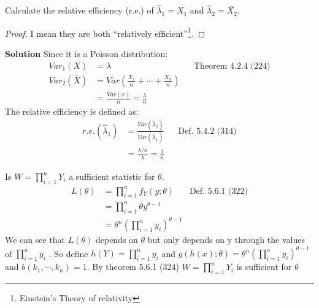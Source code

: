\documentclass[12pt]{article}
\newenvironment{problem}[2][Problem]{\begin{trivlist}
\item[\hskip \labelsep {\bfseries #1}\hskip \labelsep {\bfseries #2.}]}{\end{trivlist}}
\begin{document}
\begin{problem} {5.4.20} Calculate the relative efficiency (r.e.) of $\hat{\lambda}_1 = X_1$ and $\hat{\lambda}_2=\bar{X_2}$. 
\begin{proof} I mean they are both ``relatively efficient''\footnote{Einstein's Theory of relativity}. \end{proof}
\textbf{Solution} Since it is a Poisson distribution: 
\begin{align*}
 Var_1(X) &= \lambda && \text{Theorem 4.2.4 (224)} \\ 
 Var_2(\bar{X}) &= Var(\frac{X_1}{n} + \cdots + \frac{X_n}{n})  \\ 
 &= \frac{Var(x)}{n} = \frac{\lambda}{n}
 \end{align*}
 The relative efficiency is defined as: 
 \begin{align*}
 r.e. (\hat{\lambda}_1) &= \frac{Var(\hat{\lambda}_2)}{Var(\hat{\lambda}_1)}  && \text{Def. 5.4.2 (314)} \\
 & = \frac{\lambda /n}{\lambda} = \frac{1}{n}
\end{align*}

 
\end{problem}

\begin{problem}{5.6.6} Is $W = \prod_{i=1}^nY_i$ a sufficient statistic for $\theta $. 
\begin{align*}
L(\theta) &= \prod_{i=1}^n f_Y(y;\theta) &\text{Def. 5.6.1 (322)} \\
&= \prod_{i=1}^n \theta y^{\theta - 1} \\
&= \theta^n (\prod_{i=1}^n y_i)^{\theta-1} 
\end{align*}
We can see that $L(\theta)$ depends on $\theta$ but only depends on y through the values of $\prod_{i=1}^ny_i$ . So define $h(Y) = \prod_{i=1}^ny_i$ and $g(h(x);\theta) = \theta^n (\prod_{i=1}^n y_i)^{\theta-1} $ and $b(k_1,\cdots , k_n)=1$. By theorem 5.6.1 (324) $W = \prod_{i=1}^nY_i$ is sufficient for $\theta $
\end{problem}
\end{document}
